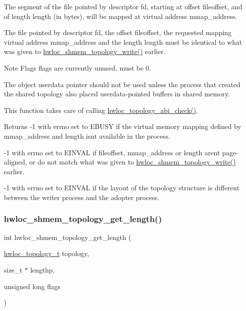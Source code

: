 The segment of the file pointed by descriptor {\ttfamily fd}, starting at offset {\ttfamily fileoffset}, and of length {\ttfamily length} (in bytes), will be mapped at virtual address {\ttfamily mmap\+\_\+address}.

The file pointed by descriptor {\ttfamily fd}, the offset {\ttfamily fileoffset}, the requested mapping virtual address {\ttfamily mmap\+\_\+address} and the length {\ttfamily length} must be identical to what was given to \hyperlink{a00226_ga61b20e346fc76f76420e3a88cc80a671}{hwloc\+\_\+shmem\+\_\+topology\+\_\+write()} earlier.

\begin{DoxyNote}{Note}
Flags {\ttfamily flags} are currently unused, must be 0.

The object userdata pointer should not be used unless the process that created the shared topology also placed userdata-\/pointed buffers in shared memory.

This function takes care of calling \hyperlink{a00186_ga0647ae66458fe68172eb5a320042f870}{hwloc\+\_\+topology\+\_\+abi\+\_\+check()}.
\end{DoxyNote}
\begin{DoxyReturn}{Returns}
-\/1 with errno set to E\+B\+U\+SY if the virtual memory mapping defined by {\ttfamily mmap\+\_\+address} and {\ttfamily length} isn\textquotesingle{}t available in the process.

-\/1 with errno set to E\+I\+N\+V\+AL if {\ttfamily fileoffset}, {\ttfamily mmap\+\_\+address} or {\ttfamily length} aren\textquotesingle{}t page-\/aligned, or do not match what was given to \hyperlink{a00226_ga61b20e346fc76f76420e3a88cc80a671}{hwloc\+\_\+shmem\+\_\+topology\+\_\+write()} earlier.

-\/1 with errno set to E\+I\+N\+V\+AL if the layout of the topology structure is different between the writer process and the adopter process. 
\end{DoxyReturn}
\mbox{\label{a00226_ga772ab52750cdd0eec85128df24888001}} 
\subsubsection{\texorpdfstring{hwloc\+\_\+shmem\+\_\+topology\+\_\+get\+\_\+length()}{hwloc\_shmem\_topology\_get\_length()}}
{\footnotesize\ttfamily int hwloc\+\_\+shmem\+\_\+topology\+\_\+get\+\_\+length (\begin{DoxyParamCaption}\item[{\hyperlink{a00186_ga9d1e76ee15a7dee158b786c30b6a6e38}{hwloc\+\_\+topology\+\_\+t}}]{topology,  }\item[{size\+\_\+t $\ast$}]{lengthp,  }\item[{unsigned long}]{flags }\end{DoxyParamCaption})}



